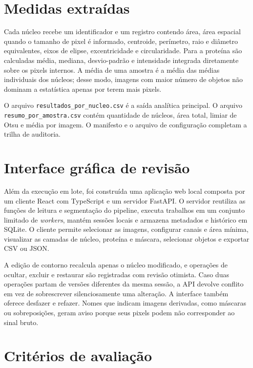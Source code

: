\section{Medidas extraídas}

Cada núcleo recebe um identificador e um registro contendo área, área espacial quando o tamanho de pixel é informado, centroide, perímetro, raio e diâmetro equivalentes, eixos de elipse, excentricidade e circularidade. Para a proteína são calculadas média, mediana, desvio-padrão e intensidade integrada diretamente sobre os pixels internos. A média de uma amostra é a média das médias individuais dos núcleos; desse modo, imagens com maior número de objetos não dominam a estatística apenas por terem mais pixels.

O arquivo \texttt{resultados\_por\_nucleo.csv} é a saída analítica principal. O arquivo \texttt{resumo\_por\_amostra.csv} contém quantidade de núcleos, área total, limiar de Otsu e média por imagem. O manifesto e o arquivo de configuração completam a trilha de auditoria.

\section{Interface gráfica de revisão}

Além da execução em lote, foi construída uma aplicação web local composta por um cliente React com TypeScript e um servidor FastAPI. O servidor reutiliza as funções de leitura e segmentação do pipeline, executa trabalhos em um conjunto limitado de \textit{workers}, mantém sessões locais e armazena metadados e histórico em SQLite. O cliente permite selecionar as imagens, configurar canais e área mínima, visualizar as camadas de núcleo, proteína e máscara, selecionar objetos e exportar CSV ou JSON.

A edição de contorno recalcula apenas o núcleo modificado, e operações de ocultar, excluir e restaurar são registradas com revisão otimista. Caso duas operações partam de versões diferentes da mesma sessão, a API devolve conflito em vez de sobrescrever silenciosamente uma alteração. A interface também oferece desfazer e refazer. Nomes que indicam imagens derivadas, como máscaras ou sobreposições, geram aviso porque seus pixels podem não corresponder ao sinal bruto.

\section{Critérios de avaliação}

